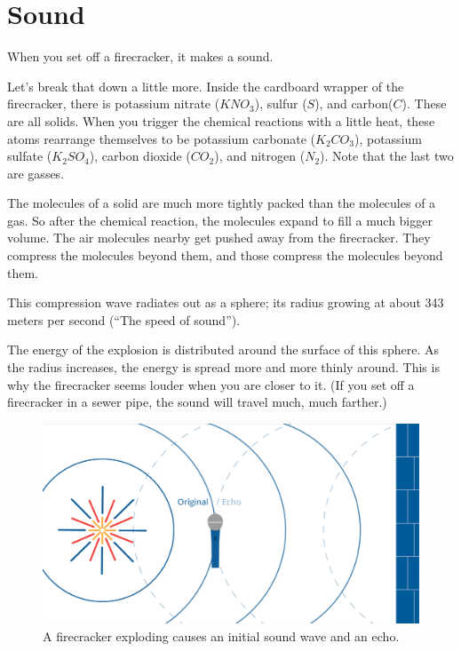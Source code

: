 \chapter{Sound}

When you set off a firecracker, it makes a sound.

Let's break that down a little more. Inside the cardboard wrapper of
the firecracker, there is potassium nitrate ($KNO_3$), sulfur ($S$),
and carbon($C$).  These are all solids. When you trigger the chemical
reactions with a little heat, these atoms rearrange themselves to be
potassium carbonate ($K_2CO_3$), potassium sulfate ($K_2SO_4$), carbon
dioxide ($CO_2$), and nitrogen ($N_2$). Note that the last two are
gasses.

The molecules of a solid are much more tightly packed than the
molecules of a gas. So after the chemical reaction, the molecules
expand to fill a much bigger volume. The air molecules nearby get
pushed away from the firecracker.  They compress the molecules beyond
them, and those compress the molecules beyond them.

This compression wave radiates out as a sphere; its radius growing at
about 343 meters per second (``The speed of sound'').

The energy of the explosion is distributed around the surface of this
sphere. As the radius increases, the energy is spread more and more
thinly around. This is why the firecracker seems louder when you are
closer to it. (If you set off a firecracker in a sewer pipe, the sound
will travel much, much farther.)
\begin{figure}[htbp]
    \centering
    \includegraphics[width=1\textwidth]{firecracker.png}
    \caption{A firecracker exploding causes an initial sound wave and an echo.}
    \label{fig:firecracker}
\end{figure}


